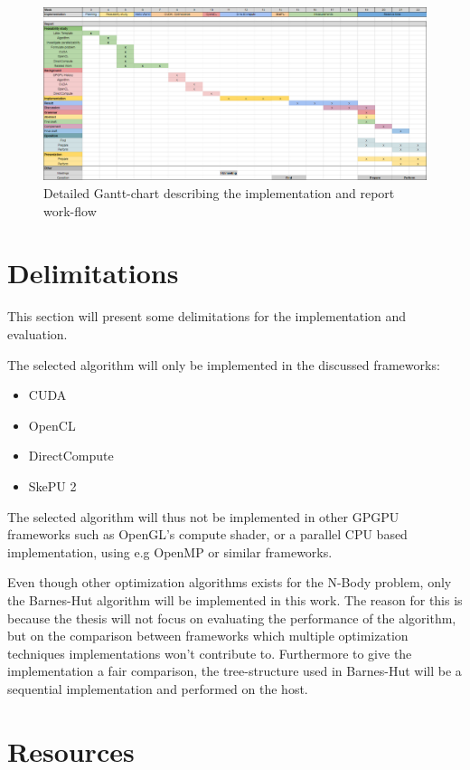 \documentclass{article}
\begin{document}
\begin{figure}
    \centering
    \includegraphics[width=1.1\textwidth]{Figs/Gantt-chart.png}
    \caption{Detailed Gantt-chart describing the implementation and report work-flow}
    \label{fig:GanttChart}
\end{figure}




\section{Delimitations}
This section will present some delimitations for the implementation and evaluation.

The selected algorithm will only be implemented in the discussed frameworks:
\begin{itemize}
    \item CUDA
    \item OpenCL
    \item DirectCompute
    \item SkePU 2
\end{itemize}

The selected algorithm will thus not be implemented in other GPGPU frameworks such as OpenGL's compute shader, or a parallel CPU based implementation, using e.g OpenMP or similar frameworks.

Even though other optimization algorithms exists for the N-Body problem, only the Barnes-Hut algorithm will be implemented in this work. The reason for this is because the thesis will not focus on evaluating the performance of the algorithm, but on the comparison between frameworks which multiple optimization techniques implementations won't contribute to. Furthermore to give the implementation a fair comparison, the tree-structure used in Barnes-Hut will be a sequential implementation and performed on the host.

\section{Resources}
\end{document}
